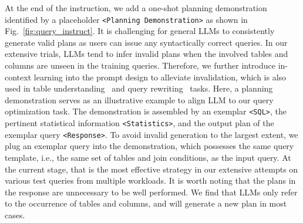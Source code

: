 At the end of the instruction, we add a one-shot planning demonstration identified by a placeholder {\color{Peach}\texttt{<Planning Demonstration>}} as shown in Fig.~\ref{fig:query_instruct}. 
It is challenging for general LLMs to consistently generate valid plans as users can issue any syntactically correct queries. In our extensive trials, LLMs tend to infer invalid plans when the involved tables and columns are unseen in the training queries. Therefore, we further introduce in-context learning into the prompt design to alleviate invalidation, which is also used in table understanding~\cite{DBLP:journals/pacmmod/LiHYCGZF0C24} and query rewriting~\cite{DBLP:journals/corr/abs-2404-12872} tasks.
%
Here, a planning demonstration serves as an illustrative example to align LLM to our query optimization task.
The demonstration is assembled by an exemplar {\color{Peach}\texttt{<SQL>}}, the pertinent statistical information {\color{Peach}\texttt{<Statistics>}}, and the output plan of the exemplar query {\color{Peach}\texttt{<Response>}}.
To avoid invalid generation to the largest extent, we plug an exemplar query into the demonstration, which possesses the same query template, i.e., the same set of tables and join conditions, as the input query. 
At the current stage, that is the most effective strategy in our extensive attempts on various test queries from multiple workloads. 
It is worth noting that the plans in the response are unnecessary to be well performed. We find that LLMs only refer to the occurrence of tables and columns, and will generate a new plan in most cases. 



